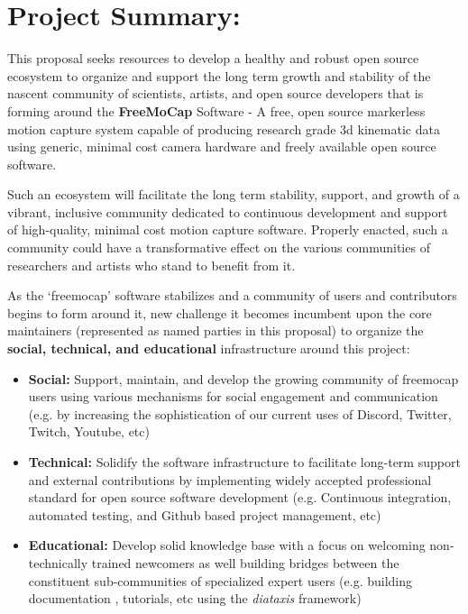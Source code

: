 \section{Project Summary:}

\noindent This proposal seeks resources to develop a healthy and robust open source ecosystem to organize and support the long term growth and stability of the nascent community of scientists, artists, and open source developers that is forming around the \textbf{FreeMoCap} Software - A free, open source markerless motion capture system capable of producing research grade 3d kinematic data using generic, minimal cost camera hardware and freely available open source software. 

 Such an ecosystem will facilitate the long term stability, support, and growth of a vibrant, inclusive community dedicated to continuous development and support of high-quality, minimal cost motion capture software. Properly enacted, such a community could have a transformative effect on the various communities of researchers and artists who stand to benefit from it.
 
As the `freemocap' software stabilizes and a community of users and contributors begins to form around it, new challenge it becomes incumbent upon the core maintainers (represented as named parties in this proposal) to organize the \textbf{social, technical, and educational} infrastructure around this project:

\begin{itemize}

    \item \textbf{Social:} Support, maintain, and develop the growing community of freemocap users using various mechanisms for social engagement and communication (e.g. by increasing the sophistication of our current uses of Discord, Twitter, Twitch, Youtube, etc)
    
    \item \textbf{Technical:} Solidify the software infrastructure to facilitate long-term support and external contributions by implementing widely accepted professional standard for open source software development (e.g. Continuous integration, automated testing, and Github based project management, etc)
    
    \item \textbf{Educational:} Develop solid knowledge base with a focus on welcoming non-technically trained newcomers as well building bridges between the constituent sub-communities of specialized expert users (e.g. building documentation , tutorials, etc using the \textit{diataxis} framework) 

\end{itemize}

